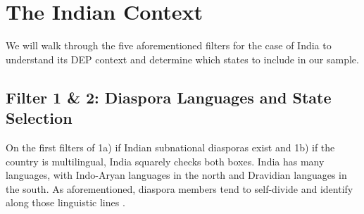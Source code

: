 \documentclass[doublespace,nopageskip]{UVAthesis}
\begin{document}
\chapter{The Indian Context} \label{chap:indian_context}
We will walk through the five aforementioned filters for the case of India to understand its DEP context and determine which states to include in our sample.

\section{Filter 1 \& 2: Diaspora Languages and State Selection} \label{ss:diaspora languages, state selection}
On the first filters of 1a) if Indian subnational diasporas exist and 1b) if the country is multilingual, India squarely checks both boxes. India has many languages, with Indo-Aryan languages in the north and Dravidian languages in the south. As aforementioned, diaspora members tend to self-divide and identify along those linguistic lines \citep{sahoo_issues_2006, gautam_indian_2013}. 
\end{document}
